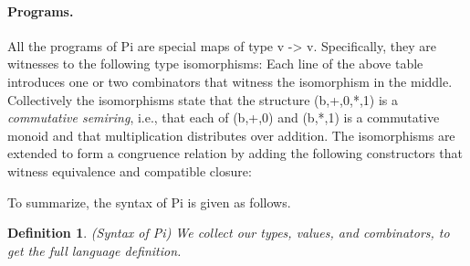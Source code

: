 \documentclass[preprint]{sigplanconf}
\newtheorem{definition}[theorem]{Definition}
\begin{document}
\paragraph*{Programs.} All the programs of {{Pi}} are special maps of type
{{v -> v}}. Specifically, they are witnesses to the following type
isomorphisms:
Each line of the above table introduces one or two combinators that witness
the isomorphism in the middle. Collectively the isomorphisms state that the
structure {{(b,+,0,*,1)}} is a \emph{commutative semiring}, i.e., that each
of {{(b,+,0)}} and {{(b,*,1)}} is a commutative monoid and that
multiplication distributes over addition. The isomorphisms are extended to
form a congruence relation by adding the following constructors that witness
equivalence and compatible closure:
%
%
%

\noindent
To summarize, the syntax of {{Pi}} is given as follows. 

\begin{definition}{(Syntax of {{Pi}})}
\label{def:Pi}
We collect our types, values, and combinators, to get the full language
definition.
%
\end{definition}










\end{document}

